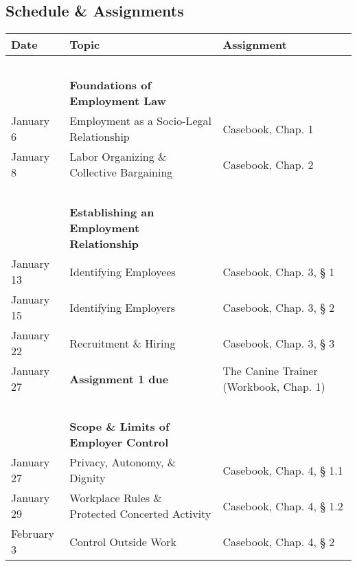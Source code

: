 \documentclass[11pt,letterpaper,twoside]{article}
\begin{document}
\subsection*{Schedule \& Assignments}\label{schedule-assignments}

\begin{longtable}[]{@{}
  >{\raggedright\arraybackslash}p{}
  >{\raggedright\arraybackslash}p{}
  >{\raggedright\arraybackslash}p{}@{}}
\toprule\noalign{}
\begin{minipage}[b]{\linewidth}\raggedright
\textbf{Date}
\end{minipage} & \begin{minipage}[b]{\linewidth}\raggedright
\textbf{Topic}
\end{minipage} & \begin{minipage}[b]{\linewidth}\raggedright
\textbf{Assignment}
\end{minipage} \\
\midrule\noalign{}
\endhead
\bottomrule\noalign{}
\endlastfoot
~ & ~ & ~ \\
~ & \textbf{Foundations of Employment Law} & ~ \\
January 6 & Employment as a Socio-Legal Relationship & Casebook, Chap.
1 \\
January 8 & Labor Organizing \& Collective Bargaining & Casebook, Chap.
2 \\
~ & ~ & ~ \\
~ & \textbf{Establishing an Employment Relationship} & ~ \\
January 13 & Identifying Employees & Casebook, Chap. 3, § 1 \\
January 15 & Identifying Employers & Casebook, Chap. 3, § 2 \\
January 22 & Recruitment \& Hiring & Casebook, Chap. 3, § 3 \\
January 27 & \textbf{Assignment 1 due} & The Canine Trainer (Workbook,
Chap. 1) \\
~ & ~ & ~ \\
~ & \textbf{Scope \& Limits of Employer Control} & ~ \\
January 27 & Privacy, Autonomy, \& Dignity & Casebook, Chap. 4, § 1.1 \\
January 29 & Workplace Rules \& Protected Concerted Activity & Casebook,
Chap. 4, § 1.2 \\
February 3 & Control Outside Work & Casebook, Chap. 4, § 2 \\

\end{longtable}
\end{document}
